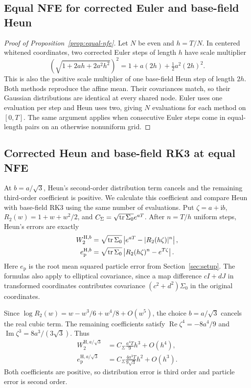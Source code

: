 \subsection{Equal NFE for corrected Euler and base-field Heun}
\label{app:equal-evaluation}

\begin{proof}[Proof of Proposition~\ref{prop:equal-nfe}]
Let $N$ be even and $h=T/N$. In centered whitened coordinates, two corrected Euler steps of length $h$ have scale multiplier
\[
 \left(\sqrt{1+2ah+2a^2h^2}\right)^2
 =1+a(2h)+\tfrac12a^2(2h)^2.
\]
This is also the positive scale multiplier of one base-field Heun step of length $2h$. Both methods reproduce the affine mean. Their covariances match, so their Gaussian distributions are identical at every shared node. Euler uses one evaluation per step and Heun uses two, giving $N$ evaluations for each method on $[0,T]$. The same argument applies when consecutive Euler steps come in equal-length pairs on an otherwise nonuniform grid.
\end{proof}

\subsection{Corrected Heun and base-field RK3 at equal NFE}
\label{app:heun-rk3}

At $b=a/\sqrt3$, Heun's second-order distribution term cancels and the remaining third-order coefficient is positive. We calculate this coefficient and compare Heun with base-field RK3 using the same number of evaluations. Put $\zeta=a+\mathrm i b$, $R_2(w)=1+w+w^2/2$, and $C_\Sigma=\sqrt{\operatorname{tr}\Sigma_0}e^{aT}$. After $n=T/h$ uniform steps, Heun's errors are exactly
\begin{align}
 W_2^{\mathrm H,b}&=\sqrt{\operatorname{tr}\Sigma_0}\left|e^{aT}-|R_2(h\zeta)|^n\right|,\\
 e_{\mathrm p}^{\mathrm H,b}&=\sqrt{\operatorname{tr}\Sigma_0}\left|R_2(h\zeta)^n-e^{T\zeta}\right|.
 \label{eq:heun-exact-particle}
\end{align}
Here $e_{\mathrm p}$ is the root mean squared particle error from Section~\ref{sec:setup}. The formulas also apply to elliptical covariance, since a map difference $cI+dJ$ in transformed coordinates contributes covariance $(c^2+d^2)\Sigma_0$ in the original coordinates.

Since $\log R_2(w)=w-w^3/6+w^4/8+O(w^5)$, the choice $b=a/\sqrt3$ cancels the real cubic term. The remaining coefficients satisfy $\operatorname{Re}\zeta^4=-8a^4/9$ and $\operatorname{Im}\zeta^3=8a^3/(3\sqrt3)$. Thus
\begin{align}
 W_2^{\mathrm H,a/\sqrt3}&=C_\Sigma\frac{a^4T}{9}h^3+O(h^4),\\
 e_{\mathrm p}^{\mathrm H,a/\sqrt3}&=C_\Sigma\frac{4a^3T}{9\sqrt3}h^2+O(h^3).
 \label{eq:heun-attained-orders}
\end{align}
Both coefficients are positive, so distribution error is third order and particle error is second order.

